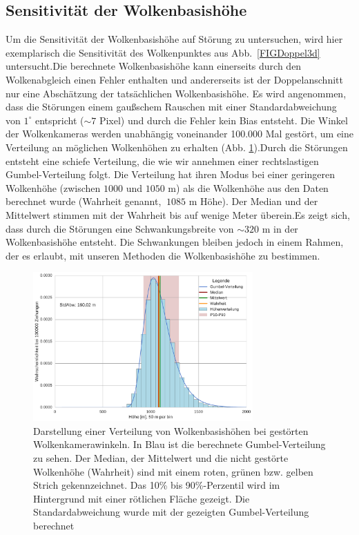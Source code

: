 \documentclass[a4paper,11pt,twoside,german]{article}
\newcommand{\absatz}{\smallbreak}
\begin{document}
\subsection{Sensitivität der Wolkenbasishöhe}
\label{SECSens}
Um die Sensitivität der Wolkenbasishöhe auf Störung zu untersuchen, wird hier
exemplarisch die Sensitivität des Wolkenpunktes aus Abb.~\ref{FIGDoppel3d}
untersucht.\absatz Die berechnete Wolkenbasishöhe kann einerseits durch den
Wolkenabgleich einen Fehler enthalten und andererseits ist der Doppelanschnitt
nur eine Abschätzung der tatsächlichen Wolkenbasishöhe.  Es wird angenommen,
dass die Störungen einem gaußschem Rauschen mit einer Standardabweichung von
$1^{\circ}$ entspricht ($\sim7$ Pixel) und durch die Fehler kein Bias entsteht.
Die Winkel der Wolkenkameras werden unabhängig voneinander 100.000 Mal gestört,
um eine Verteilung an möglichen Wolkenhöhen zu erhalten (Abb.
\ref{FIGSens}).\absatz Durch die Störungen entsteht eine schiefe Verteilung, die
wie wir annehmen einer rechtslastigen Gumbel-Verteilung folgt.  Die Verteilung
hat ihren Modus bei einer geringeren Wolkenhöhe (zwischen $1000$ und $1050$ m)
als die Wolkenhöhe aus den Daten berechnet wurde (Wahrheit genannt, $~1085$ m
Höhe). Der Median und der Mittelwert stimmen mit der Wahrheit bis auf wenige
Meter überein.\absatz Es zeigt sich, dass durch die Störungen eine
Schwankungsbreite von $\sim320$ m in der Wolkenbasishöhe entsteht. Die
Schwankungen bleiben jedoch in einem Rahmen, der es erlaubt, mit unseren
Methoden die Wolkenbasishöhe zu bestimmen.  \clearpage

\begin{figure}[h]
	\begin{center}
        \includegraphics[width=0.75\textwidth]{media/sens_prob_height.pdf}
        \caption[Wolkenhöhenverteilung von gestörten
        Wolkenkamerawinkeln]{Darstellung einer Verteilung von Wolkenbasishöhen
        bei gestörten Wolkenkamerawinkeln. In Blau ist die berechnete
        Gumbel-Verteilung zu sehen. Der Median, der Mittelwert und die nicht
        gestörte Wolkenhöhe (Wahrheit) sind mit einem roten, grünen bzw. gelben
        Strich gekennzeichnet. Das 10\% bis 90\%-Perzentil wird im Hintergrund
        mit einer rötlichen Fläche gezeigt. Die Standardabweichung wurde mit der
        gezeigten Gumbel-Verteilung berechnet} \label{FIGSens} \end{center}
        \end{figure}
\end{document}
